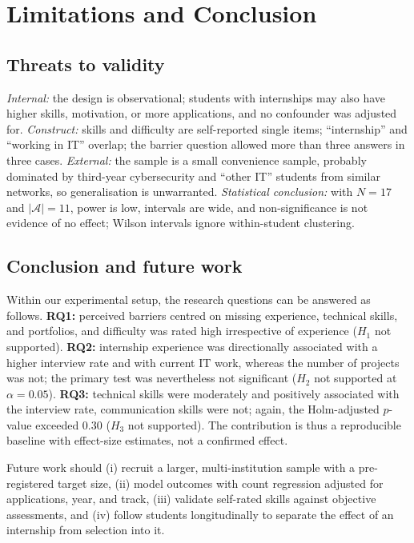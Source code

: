 \documentclass[conference]{IEEEtran}
\begin{document}
\section{Limitations and Conclusion}
\label{sec:conclusion}

\subsection{Threats to validity}
\textit{Internal:} the design is observational; students with internships may also have higher skills, motivation, or more applications, and no confounder was adjusted for. \textit{Construct:} skills and difficulty are self-reported single items; ``internship'' and ``working in IT'' overlap; the barrier question allowed more than three answers in three cases. \textit{External:} the sample is a small convenience sample, probably dominated by third-year cybersecurity and ``other IT'' students from similar networks, so generalisation is unwarranted. \textit{Statistical conclusion:} with $N=17$ and $|\mathcal{A}|=11$, power is low, intervals are wide, and non-significance is not evidence of no effect; Wilson intervals ignore within-student clustering.

\subsection{Conclusion and future work}
Within our experimental setup, the research questions can be answered as follows. \textbf{RQ1:} perceived barriers centred on missing experience, technical skills, and portfolios, and difficulty was rated high irrespective of experience ($H_1$ not supported). \textbf{RQ2:} internship experience was directionally associated with a higher interview rate and with current IT work, whereas the number of projects was not; the primary test was nevertheless not significant ($H_2$ not supported at $\alpha=0.05$). \textbf{RQ3:} technical skills were moderately and positively associated with the interview rate, communication skills were not; again, the Holm-adjusted $p$-value exceeded 0.30 ($H_3$ not supported). The contribution is thus a reproducible baseline with effect-size estimates, not a confirmed effect.

Future work should (i) recruit a larger, multi-institution sample with a pre-registered target size, (ii) model outcomes with count regression adjusted for applications, year, and track, (iii) validate self-rated skills against objective assessments, and (iv) follow students longitudinally to separate the effect of an internship from selection into it.

\balance


\end{document}

